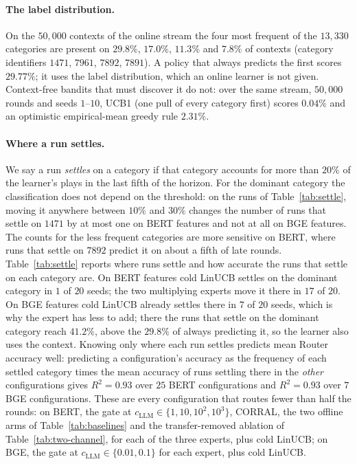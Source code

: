 \documentclass[anon]{alt2027} %
\begin{document}
\paragraph{The label distribution.}
On the $50{,}000$ contexts of the online stream the four most frequent of the
$13{,}330$ categories are present on $29.8\%$, $17.0\%$, $11.3\%$ and $7.8\%$
of contexts (category identifiers $1471$, $7961$, $7892$, $7891$). A policy
that always predicts the first scores $29.77\%$; it uses the label
distribution, which an online learner is not given. Context-free bandits that
must discover it do not: over the same stream, $50{,}000$ rounds and seeds
$1$--$10$, UCB1 (one pull of every category first) scores $0.04\%$ and an
optimistic empirical-mean greedy rule $2.31\%$.

\paragraph{Where a run settles.}
We say a run \emph{settles} on a category if that category accounts for more
than $20\%$ of the learner's plays in the last fifth of the horizon. For the
dominant category the classification does not depend on the threshold: on the
runs of Table~\ref{tab:settle}, moving it anywhere between $10\%$ and $30\%$
changes the number of runs that settle on $1471$ by at most one on BERT
features and not at all on BGE features. The counts for the less frequent
categories are more sensitive on BERT, where runs that settle on $7892$
predict it on about a fifth of late rounds. Table~\ref{tab:settle}
reports where runs settle and how accurate the runs that settle on each
category are. On BERT features cold LinUCB settles on the dominant category
in $1$ of $20$ seeds; the two multiplying experts move it there in $17$ of
$20$. On BGE features cold LinUCB already settles there in $7$ of $20$ seeds,
which is why the expert has less to add; there the runs that settle on the
dominant category reach $41.2\%$, above the $29.8\%$ of always predicting
it, so the learner also uses the context. Knowing only where each run
settles predicts mean Router accuracy well: predicting a configuration's
accuracy as the frequency of each settled category times the mean accuracy
of runs settling there in the \emph{other} configurations gives $R^2=0.93$
over $25$ BERT configurations and $R^2=0.93$ over $7$ BGE configurations.
These are every configuration that routes fewer than half the rounds: on
BERT, the gate at $c_{\mathrm{LLM}}\in\{1,10,10^2,10^3\}$, CORRAL, the two offline arms of
Table~\ref{tab:baselines} and the transfer-removed ablation of
Table~\ref{tab:two-channel}, for each of the three experts, plus cold
LinUCB; on BGE, the gate at $c_{\mathrm{LLM}}\in\{0.01,0.1\}$ for each expert, plus cold
LinUCB.
\end{document}
